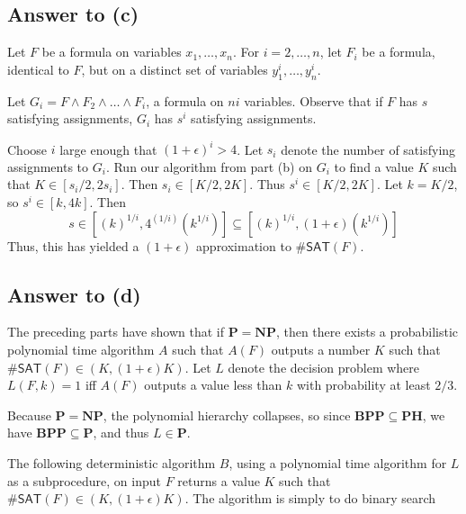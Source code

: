 \documentclass{article}
\renewcommand{\P}{\mathbf{P}}
\newcommand{\NP}{\mathbf{NP}}
\newcommand{\BPP}{\mathbf{BPP}}
\newcommand{\PH}{\mathbf{PH}}
\def \eps {{\varepsilon}}
\begin{document}
\subsection*{Answer to (c)}

Let $F$ be a formula on variables $x_1, \dots, x_n$.
For $i = 2, \dots, n$, let $F_i$ be a formula, identical to $F$, but on a distinct set of variables $y^i_1, \dots, y^i_n$.

Let $G_i = F \wedge F_2 \wedge \dots \wedge F_i$, a formula on $ni$ variables.
Observe that if $F$ has $s$ satisfying assignments, $G_i$ has $s^i$ satisfying assignments.

Choose $i$ large enough that $(1 + \epsilon)^i > 4$.
Let $s_i$ denote the number of satisfying assignments to $G_i$.
Run our algorithm from part (b) on $G_i$ to find a value $K$ such that
$K \in [s_i/2, 2s_i]$.
Then $s_i \in [K/2, 2K]$.
Thus $s^i \in [K/2, 2K]$.
Let $k = K/2$, so $s^i \in [k, 4k]$.
Then $$s \in [(k)^{1/i}, 4^{(1/i)}(k^{1/i})] \subseteq [(k)^{1/i}, (1 + \epsilon)(k^{1/i})]$$
Thus, this has yielded a $(1 + \epsilon)$ approximation to $\#\mathsf{SAT}(F)$.

\subsection*{Answer to (d)}
The preceding parts have shown that if $\P = \NP$, then there exists a probabilistic polynomial time algorithm $A$ such that $A(F)$ outputs a number $K$ such that $\#\mathsf{SAT}(F) \in (K, (1 + \epsilon) K)$.
Let $L$ denote the decision problem where $L(F, k) = 1$ iff $A(F)$ outputs a value less than $k$ with probability at least $2/3$.



Because $\P = \NP$, the polynomial hierarchy collapses, so since $\BPP \subseteq \PH$,
we have $\BPP \subseteq \P$, and thus $L \in \P$.

The following deterministic algorithm $B$, using a polynomial time algorithm for $L$ as a subprocedure, on input $F$ returns a value $K$ such that $\#\mathsf{SAT}(F) \in (K, (1 + \epsilon) K)$.
The algorithm is simply to do binary search 




\end{document}

